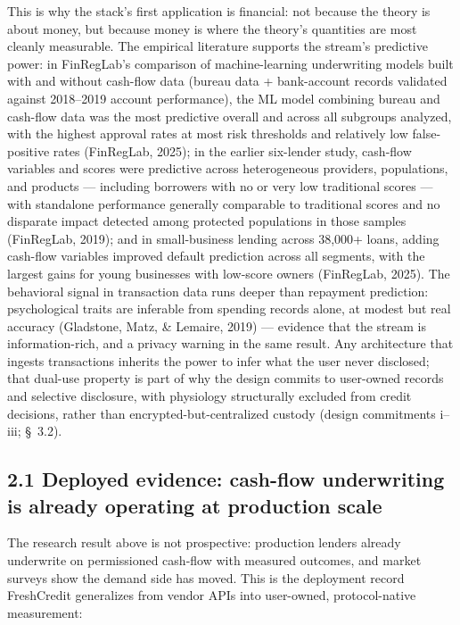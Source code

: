 \documentclass[
]{article}
\begin{document}
This is why the stack's first application is financial: not because the
theory is about money, but because money is where the theory's
quantities are most cleanly measurable. The empirical literature
supports the stream's predictive power: in FinRegLab's comparison of
machine-learning underwriting models built with and without cash-flow
data (bureau data + bank-account records validated against 2018--2019
account performance), the ML model combining bureau and cash-flow data
was the most predictive overall and across all subgroups analyzed, with
the highest approval rates at most risk thresholds and relatively low
false-positive rates (FinRegLab, 2025); in the earlier six-lender study,
cash-flow variables and scores were predictive across heterogeneous
providers, populations, and products --- including borrowers with no or
very low traditional scores --- with standalone performance generally
comparable to traditional scores and no disparate impact detected among
protected populations in those samples (FinRegLab, 2019); and in
small-business lending across 38,000+ loans, adding cash-flow variables
improved default prediction across all segments, with the largest gains
for young businesses with low-score owners (FinRegLab, 2025). The
behavioral signal in transaction data runs deeper than repayment
prediction: psychological traits are inferable from spending records
alone, at modest but real accuracy (Gladstone, Matz, \& Lemaire, 2019)
--- evidence that the stream is information-rich, and a privacy warning
in the same result. Any architecture that ingests transactions inherits
the power to infer what the user never disclosed; that dual-use property
is part of why the design commits to user-owned records and selective
disclosure, with physiology structurally excluded from credit decisions,
rather than encrypted-but-centralized custody (design commitments
i--iii; §~3.2).

\subsection{2.1 Deployed evidence: cash-flow underwriting is already
operating at production
scale}\label{deployed-evidence-cash-flow-underwriting-is-already-operating-at-production-scale}

The research result above is not prospective: production lenders already
underwrite on permissioned cash-flow with measured outcomes, and market
surveys show the demand side has moved. This is the deployment record
FreshCredit generalizes from vendor APIs into user-owned,
protocol-native measurement:
\end{document}
